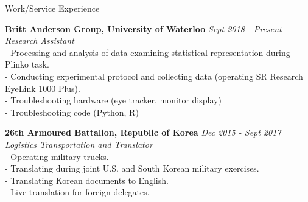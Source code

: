 \documentclass{resume} %
\begin{document}
\begin{rSection}{Work/Service Experience}

{\bf Britt Anderson Group, University of Waterloo} \hfill {\em Sept 2018 - Present} 
\\{\textit{Research Assistant}}
\\- Processing and analysis of data examining statistical representation during Plinko task.
\\- Conducting experimental protocol and collecting data (operating SR Research EyeLink 1000 Plus).
\\- Troubleshooting hardware (eye tracker, monitor display)
\\- Troubleshooting code (Python, R)


{\bf 26th Armoured Battalion, Republic of Korea } \hfill {\em Dec 2015 - Sept 2017} 
\\{\textit{Logistics Transportation and Translator}}\\
- Operating military trucks.
\\- Translating during joint U.S. and South Korean military exercises.
\\- Translating Korean documents to English.
\\- Live translation for foreign delegates.




\end{rSection}




\end{document}

